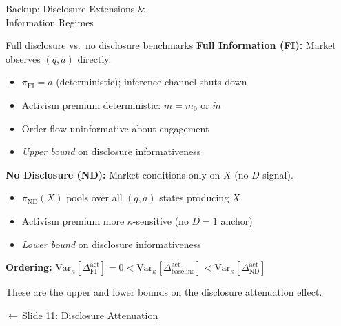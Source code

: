 \documentclass[aspectratio=169,10pt]{beamer}
\newcommand{\1}{\mathbf{1}}
\newcommand{\returnlink}[2]{%
  \par\vspace{0.2em}\hfill{\scriptsize\hyperlink{#1}{\textcolor{brightblue}{$\leftarrow$\,#2}}}%
}
\begin{document}
\begin{frame}[standout]
Backup: Disclosure Extensions \&\\ Information Regimes
\end{frame}

\begin{frame}{Full disclosure vs.\ no disclosure benchmarks}
\hypertarget{backup:disclosure_regimes}{}
\small
\textbf{Full Information (FI):} Market observes $(q,a)$ directly.
\begin{itemize}\itemsep0.05em
  \item $\pi_{\text{FI}} = a$ (deterministic); inference channel shuts down
  \item Activism premium deterministic: $\bar{m} = m_0$ or $\tilde{m}$
  \item Order flow uninformative about engagement
  \item \emph{Upper bound} on disclosure informativeness
\end{itemize}

\vspace{0.3em}

\textbf{No Disclosure (ND):} Market conditions only on $X$ (no $D$ signal).
\begin{itemize}\itemsep0.05em
  \item $\pi_{\text{ND}}(X)$ pools over all $(q,a)$ states producing $X$
  \item Activism premium more $\kappa$-sensitive (no $D=1$ anchor)
  \item \emph{Lower bound} on disclosure informativeness
\end{itemize}

\vspace{0.3em}

\textbf{Ordering:} $\text{Var}_{\kappa}[\Delta^{\text{act}}_{\text{FI}}] = 0 < \text{Var}_{\kappa}[\Delta^{\text{act}}_{\text{baseline}}] < \text{Var}_{\kappa}[\Delta^{\text{act}}_{\text{ND}}]$

\vspace{0.2em}
These are the upper and lower bounds on the disclosure attenuation effect.

\returnlink{main:attenuation}{Slide 11: Disclosure Attenuation}
\end{frame}
\end{document}
